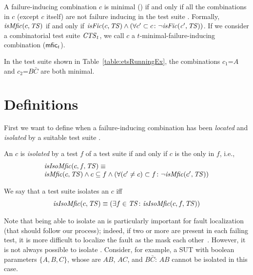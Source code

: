 \begin{tikzborder}{\cite{Gargantini16:validation}}
\begin{tikzborder}{\cite{gargantini_combinatorial_2017}}
\begin{tikzborder}{\cite{gargantini_combinatorial_2017}}
\begin{tikzborder}{\cite{garn2019}}
\begin{tikzborder}{\cite{arcaini2019achieving}}
\begin{tikzborder}{}
\begin{defn}\label{def:mfic}
	A failure-inducing combination $c$ is minimal (\mfic) if and only if all the combinations in $c$ (except $c$ itself) are not failure inducing in the test suite \ts. Formally, $\mathit{isMfic}(c, \mathit{TS})$ if and only if $\mathit{isFic}(c, \mathit{TS}) \wedge (\forall c^\prime \subset c \colon \neg \mathit{\mathit{isFic}(c^\prime, \mathit{TS})})$. If we consider a combinatorial test suite $\mathit{CTS}_t$, we call $c$ a $t$-minimal-failure-inducing combination ($\textsf{mfic}_t$).
\end{defn}

\begin{example}\label{ex:minFic}
	In the test suite shown in Table~\ref{table:etsRunningEx}, the combinations $c_1$=$A$ and $c_2$=$B\bar{C}$ are both minimal.
\end{example}
\end{tikzborder}

\section{Definitions}\label{sec:definitions}

\begin{tikzborder}{}
First we want to define when a failure-inducing combination has been \emph{located} and \emph{isolated} by a suitable test suite \ts.

\begin{defn}\label{def:isolatedMfic}
	An \mfic $c$ is {\it isolated} by a test $f$ of a test suite \ts if and only if $c$ is the only \fic in $f$, i.e.,
	\[\begin{array}{l}\mathit{isIsoMfic}(c, f, \mathit{TS}) \equiv\\
	\mathit{isMfic}(c, \mathit{TS}) \wedge c \subseteq f \wedge (\forall (c^\prime \neq c) \subset f \colon \neg \mathit{isMfic}(c^\prime, \mathit{TS}))\end{array}\]
	
	We say that a test suite \ts isolates an \mfic $c$ iff
	\[\mathit{isIsoMfic}(c, \mathit{TS}) \equiv (\exists f \in \mathit{TS} \colon \mathit{isIsoMfic}(c, f, \mathit{TS}))\]
\end{defn}

Note that being able to isolate an \mfic is particularly important for fault localization (that should follow our process); indeed, if two or more \mfics are present in each failing test, it is more difficult to localize the fault as the \mfics mask each other~\cite{Niu2018Identifying}. However, it is not always possible to isolate \mfics. Consider, for example, a SUT with boolean parameters $\{A,B,C\}$, whose \truemfics are $AB$, $AC$, and $B\bar{C}$: $AB$ cannot be isolated in this case.


\end{tikzborder}
\end{tikzborder}
\end{tikzborder}
\end{tikzborder}
\end{tikzborder}
\end{tikzborder}

